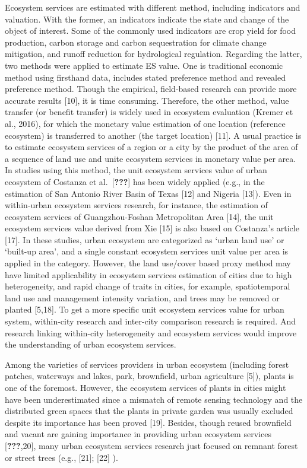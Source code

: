 \documentclass[
]{article}
\begin{document}
Ecosystem services are estimated with different method, including indicators and valuation.
With the former, an indicators indicate the state and change of the object of interest. Some of the commonly used indicators are crop yield for food production, carbon storage and carbon sequestration for climate change mitigation, and runoff reduction for hydrological regulation.
Regarding the latter, two methods were applied to estimate ES value.
One is traditional economic method using firsthand data, includes stated preference method and revealed preference method.
Though the empirical, field-based research can provide more accurate results {[}10{]}, it is time consuming.
Therefore, the other method, value transfer (or benefit transfer) is widely used in ecosystem evaluation (Kremer et al., 2016), for which the monetary value estimation of one location (reference ecosystem) is transferred to another (the target location) {[}11{]}.
A usual practice is to estimate ecosystem services of a region or a city by the product of the area of a sequence of land use and unite ecosystem services in monetary value per area.
In studies using this method, the unit ecosystem services value of urban ecosystem of Costanza et al.~{[}{\textbf{???}}{]} has been widely applied (e.g., in the estimation of San Antonio River Basin of Texas {[}12{]} and Nigeria {[}13{]}).
Even in within-urban ecosystem services research, for instance, the estimation of ecosystem services of Guangzhou-Foshan Metropolitan Area {[}14{]}, the unit ecosystem services value derived from Xie {[}15{]} is also based on Costanza's article {[}17{]}.
In these studies, urban ecosystem are categorized as `urban land use' or `built-up area', and a single constant ecosystem services unit value per area is applied in the category.
However, the land use/cover based proxy method may have limited applicability in ecosystem services estimation of cities due to high heterogeneity, and rapid change of traits in cities, for example, spatiotemporal land use and management intensity variation, and trees may be removed or planted {[}5,18{]}.
To get a more specific unit ecosystem services value for urban system, within-city research and inter-city comparison research is required. And research linking within-city heterogeneity and ecosystem services would improve the understanding of urban ecosystem services.

Among the varieties of services providers in urban ecosystem (including forest patches, waterways and lakes, park, brownfield, urban agriculture {[}5{]}), plants is one of the foremost.
However, the ecosystem services of plants in cities might have been underestimated since a mismatch of remote sensing technology and the distributed green spaces that the plants in private garden was usually excluded despite its importance has been proved {[}19{]}.
Besides, though reused brownfield and vacant are gaining importance in providing urban ecosystem services {[}{\textbf{???}},20{]}, many urban ecosystem services research just focused on remnant forest or street trees (e.g., {[}21{]}; {[}22{]} ).
\end{document}
